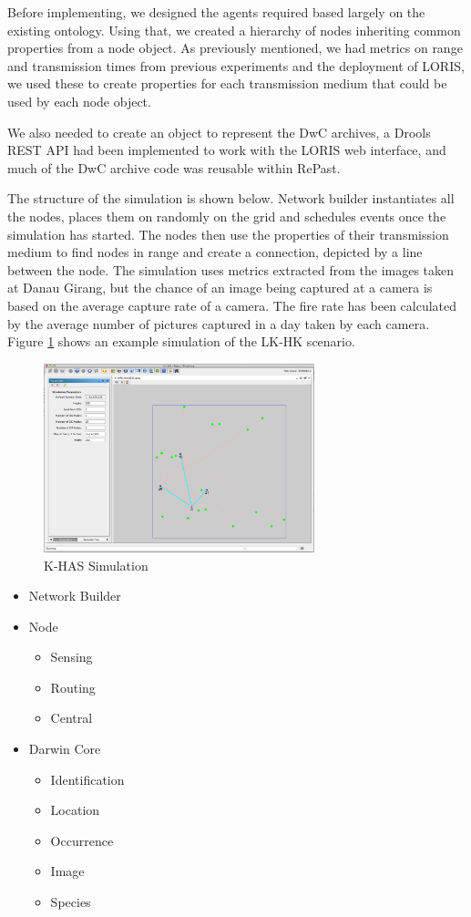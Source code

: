 Before implementing, we designed the agents required based largely on the existing ontology. Using that, we created a hierarchy of nodes inheriting common properties from a node object. As previously mentioned, we had metrics on range and transmission times from previous experiments and the deployment of LORIS, we used these to create properties for each transmission medium that could be used by each node object.

We also needed to create an object to represent the DwC archives, a Drools REST API had been implemented to work with the LORIS web interface, and much of the DwC archive code was reusable within RePast. 

The structure of the simulation is shown below. Network builder instantiates all the nodes, places them on randomly on the grid and schedules events once the simulation has started. The nodes then use the properties of their transmission medium to find nodes in range and create a connection, depicted by a line between the node. The simulation uses metrics extracted from the images taken at Danau Girang, but the chance of an image being captured at a camera is based on the average capture rate of a camera. The fire rate has been calculated by the average number of pictures captured in a day taken by each camera. Figure \ref{fig:sim} shows an example simulation of the LK-HK scenario.


	\begin{figure}[h]
	\centering
	\includegraphics[width=0.70\textwidth]{Chap7/figures/khas_sim}
	\caption{K-HAS Simulation}
	\label{fig:sim}
	\end{figure}


\begin{itemize}
\item Network Builder
\item Node
	\begin{itemize}
	\item Sensing
	\item Routing
	\item Central
	\end{itemize}
\item Darwin Core
	\begin{itemize}
	\item Identification
	\item Location
	\item Occurrence
	\item Image
	\item Species
	\end{itemize}	 
\end{itemize}

